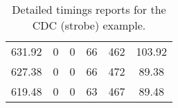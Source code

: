 \begin{table}[h]
{\begin{tabular}{cccccc}
            631.92             & 0                         & 0                         & 66                         & 462                        & 103.92                 \\
            627.38             & 0                         & 0                         & 66                         & 472                        & 89.38                  \\
            619.48             & 0                         & 0                         & 63                         & 467                        & 89.48                  \\
            \bottomrule
        \end{tabular}
    }
    \caption{Detailed timings reports for the CDC (strobe) example.}
\end{table}


